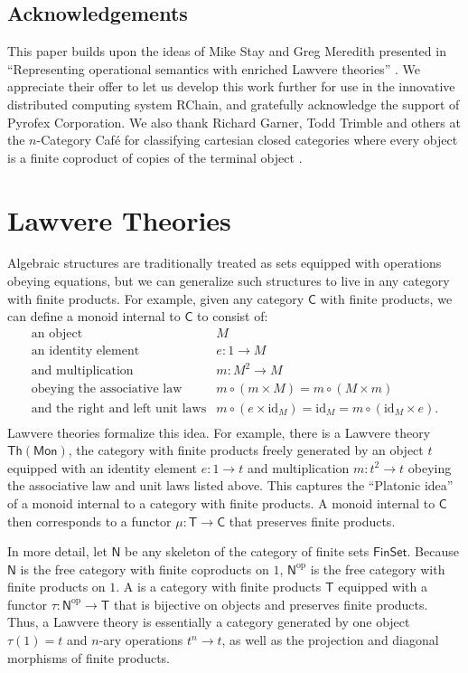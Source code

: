 \documentclass{amsart}
\newcommand{\define}[1]{{\bf \boldmath{#1}}}
\theoremstyle{definition}
\newcommand{\Th}{\mathsf{Th}}
\newcommand{\Mon}{\mathsf{Mon}}
\newcommand{\FinSet}{\mathsf{FinSet}}
\newcommand{\NN}{\mathsf{N}}
\newcommand{\C}{\mathsf{C}}
\newcommand{\T}{\mathsf{T}}
\newcommand{\op}{\mathrm{op}}
\newcommand{\maps}{\colon}
\newcommand{\id}{\mathrm{id}}
\begin{document}
\subsection*{Acknowledgements}

This paper builds upon the ideas of Mike Stay and Greg Meredith presented in ``Representing operational semantics with enriched Lawvere theories''  \cite{roswelt}.  We appreciate their offer to let us develop this work further for use in the innovative distributed computing system RChain, and gratefully acknowledge the support of Pyrofex Corporation.  We also thank Richard Garner, Todd Trimble and others at the $n$-Category Caf\'e for classifying cartesian closed categories where every object is a finite coproduct of copies of the terminal object \cite{nCafe}.

\section{Lawvere Theories}
\label{sec:lawvere}

Algebraic structures are traditionally treated as sets equipped with operations obeying equations, but we can generalize such structures to live in any category with finite products.  For example,
given any category $\C$ with finite products, we can define a monoid internal to $\C$ to consist of:
\[\begin{array}{rl}
\text{an object} & M\\
\text{an identity element} & e\maps 1 \to M\\
\text{and multiplication} & m\maps M^2 \to M\\
\text{obeying the associative law} & m \circ (m \times M) = m \circ (M \times m)\\
\text{and the right and left unit laws} & m \circ (e  \times \id_M) = \id_M = m \circ (\id_M \times e).\\
\end{array}\]
Lawvere theories formalize this idea.  For example, there is a Lawvere theory $\Th(\Mon)$, the category with finite products freely generated by an object $t$ equipped with an identity element $e \maps 1 \to t$ and multiplication $m \maps t^2 \to t$ obeying the associative law and unit laws listed above.    This captures the ``Platonic idea'' of a monoid internal to a category with finite products.  A monoid internal to $\C$ then corresponds to a functor $\mu \maps \T \to \C$ that preserves finite products.  

In more detail, let $\NN$ be any skeleton of the category of finite sets $\FinSet$.  Because $\NN$ is the free category with finite coproducts on $1$, $\NN^\op$ is the free category with finite products on $1$.   A \define{Lawvere theory} is a category with finite products $\T$ equipped with a functor $\tau \maps \NN^\op \to \T$ that is bijective on objects and preserves finite products.   Thus, a Lawvere theory is essentially a category generated by one object $\tau(1) = t$ and $n$-ary operations $t^n \to t$, as well as the projection and diagonal morphisms of finite products.
\end{document}
